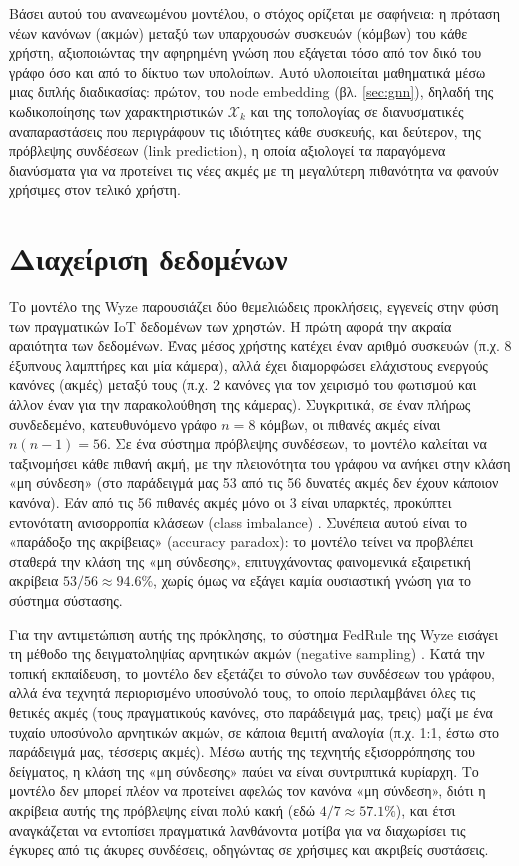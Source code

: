 Βάσει αυτού του ανανεωμένου μοντέλου, ο στόχος ορίζεται με σαφήνεια: η πρόταση νέων κανόνων (ακμών) μεταξύ των υπαρχουσών συσκευών (κόμβων) του κάθε χρήστη, αξιοποιώντας την αφηρημένη γνώση που εξάγεται τόσο από τον δικό του γράφο όσο και από το δίκτυο των υπολοίπων. Αυτό υλοποιείται μαθηματικά μέσω μιας διπλής διαδικασίας: πρώτον, του node embedding (βλ. \autoref{sec:gnn}), δηλαδή της κωδικοποίησης των χαρακτηριστικών $\mathcal{X}_k$ και της τοπολογίας σε διανυσματικές αναπαραστάσεις που περιγράφουν τις ιδιότητες κάθε συσκευής, και δεύτερον, της πρόβλεψης συνδέσεων (link prediction), η οποία αξιολογεί τα παραγόμενα διανύσματα για να προτείνει τις νέες ακμές με τη μεγαλύτερη πιθανότητα να φανούν χρήσιμες στον τελικό χρήστη.

\section{Διαχείριση δεδομένων}\label{sec:data}
Το μοντέλο της Wyze παρουσιάζει δύο θεμελιώδεις προκλήσεις, εγγενείς στην φύση των πραγματικών IoT δεδομένων των χρηστών. Η πρώτη αφορά την ακραία αραιότητα των δεδομένων. Ένας μέσος χρήστης κατέχει έναν αριθμό συσκευών (π.χ. 8 έξυπνους λαμπτήρες και μία κάμερα), αλλά έχει διαμορφώσει ελάχιστους ενεργούς κανόνες (ακμές) μεταξύ τους (π.χ. 2 κανόνες για τον χειρισμό του φωτισμού και άλλον έναν για την παρακολούθηση της κάμερας). Συγκριτικά, σε έναν πλήρως συνδεδεμένο, κατευθυνόμενο γράφο $n=8$ κόμβων, οι πιθανές ακμές είναι $n(n-1)=56$. Σε ένα σύστημα πρόβλεψης συνδέσεων, το μοντέλο καλείται να ταξινομήσει κάθε πιθανή ακμή, με την πλειονότητα του γράφου να ανήκει στην κλάση «μη σύνδεση» (στο παράδειγμά μας 53 από τις 56 δυνατές ακμές δεν έχουν κάποιον κανόνα). Εάν από τις 56 πιθανές ακμές μόνο οι 3 είναι υπαρκτές, προκύπτει εντονότατη ανισορροπία κλάσεων (class imbalance) \cite{he_learning_2009}. Συνέπεια αυτού είναι το «παράδοξο της ακρίβειας» (accuracy paradox): το μοντέλο τείνει να προβλέπει σταθερά την κλάση της «μη σύνδεσης», επιτυγχάνοντας φαινομενικά εξαιρετική ακρίβεια $53/56 \approx 94.6\%$, χωρίς όμως να εξάγει καμία ουσιαστική γνώση για το σύστημα σύστασης.

Για την αντιμετώπιση αυτής της πρόκλησης, το σύστημα FedRule της Wyze εισάγει τη μέθοδο της δειγματοληψίας αρνητικών ακμών (negative sampling) \cite{he_learning_2009}. Κατά την τοπική εκπαίδευση, το μοντέλο δεν εξετάζει το σύνολο των συνδέσεων του γράφου, αλλά ένα τεχνητά περιορισμένο υποσύνολό τους, το οποίο περιλαμβάνει όλες τις θετικές ακμές (τους πραγματικούς κανόνες, στο παράδειγμά μας, τρεις) μαζί με ένα τυχαίο υποσύνολο αρνητικών ακμών, σε κάποια θεμιτή αναλογία (π.χ. 1:1, έστω στο παράδειγμά μας, τέσσερις ακμές). Μέσω αυτής της τεχνητής εξισορρόπησης του δείγματος, η κλάση της «μη σύνδεσης» παύει να είναι συντριπτικά κυρίαρχη. Το μοντέλο δεν μπορεί πλέον να προτείνει αφελώς τον κανόνα «μη σύνδεση», διότι η ακρίβεια αυτής της πρόβλεψης είναι πολύ κακή (εδώ $4/7 \approx 57.1\%$), και έτσι αναγκάζεται να εντοπίσει πραγματικά λανθάνοντα μοτίβα για να διαχωρίσει τις έγκυρες από τις άκυρες συνδέσεις, οδηγώντας σε χρήσιμες και ακριβείς συστάσεις.

